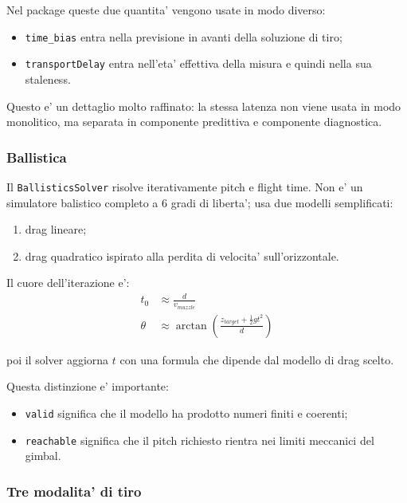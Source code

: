 \documentclass[11pt,a4paper]{article}
\newcommand{\code}[1]{\texttt{#1}}
\begin{document}
Nel package queste due quantita' vengono usate in modo diverso:
\begin{itemize}[leftmargin=1.4em]
  \item \code{time\_bias} entra nella previsione in avanti della soluzione di tiro;
  \item \code{transportDelay} entra nell'eta' effettiva della misura e quindi nella sua staleness.
\end{itemize}

Questo e' un dettaglio molto raffinato: la stessa latenza non viene usata in modo monolitico, ma separata in componente predittiva e componente diagnostica.

\subsubsection{Ballistica}

Il \code{BallisticsSolver} risolve iterativamente pitch e flight time. Non e' un simulatore balistico completo a 6 gradi di liberta'; usa due modelli semplificati:
\begin{enumerate}[leftmargin=1.4em]
  \item drag lineare;
  \item drag quadratico ispirato alla perdita di velocita' sull'orizzontale.
\end{enumerate}

Il cuore dell'iterazione e':
\begin{align}
  t_0 &\approx \frac{d}{v_{muzzle}} \\
  \theta &\approx \arctan\left(\frac{z_{target} + \frac{1}{2} g t^2}{d}\right)
\end{align}

poi il solver aggiorna \(t\) con una formula che dipende dal modello di drag scelto.

Questa distinzione e' importante:
\begin{itemize}[leftmargin=1.4em]
  \item \code{valid} significa che il modello ha prodotto numeri finiti e coerenti;
  \item \code{reachable} significa che il pitch richiesto rientra nei limiti meccanici del gimbal.
\end{itemize}

\subsubsection{Tre modalita' di tiro}
\end{document}
